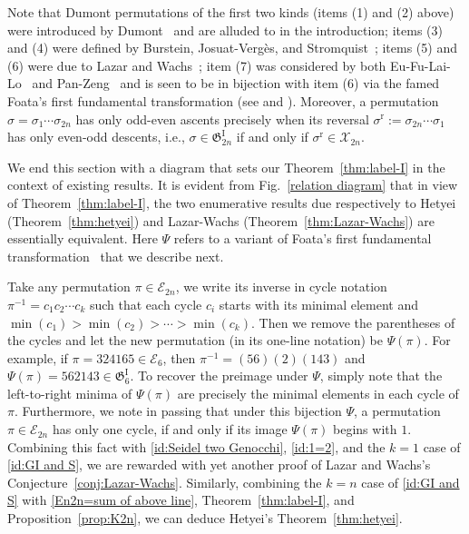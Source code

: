 \documentclass[11pt,reqno]{amsart}
\numberwithin{equation}{section}
\theoremstyle{plain}
\theoremstyle{definition}
\newcommand{\cE}{\mathcal{E}}
\newcommand{\fG}{\mathfrak{G}}
\newcommand{\cX}{\mathcal{X}}
\newcommand{\GI}{\fG^{\mathrm{I}}}
\begin{document}
Note that Dumont permutations of the first two kinds (items (1) and (2) above) were introduced by Dumont~\cite{dum74} and are alluded to in the introduction; items (3) and (4) were defined by Burstein, Josuat-Verg\`es, and Stromquist~\cite{BJS10}; items (5) and (6) were due to Lazar and Wachs~\cite{LW22}; item (7) was considered by both Eu-Fu-Lai-Lo~\cite{EFLL22} and Pan-Zeng~\cite{PZ23} and is seen to be in bijection with item (6) via the famed Foata's first fundamental transformation (see \cite{FS70,PZ23} and \cite[Prop.~2.11]{EFLL22}). Moreover, a permutation $\sigma=\sigma_1\cdots\sigma_{2n}$ has only odd-even ascents precisely when its reversal $\sigma^{\mathrm{r}}:=\sigma_{2n}\cdots\sigma_1$ has only even-odd descents, i.e., $\sigma\in \GI_{2n}$ if and only if $\sigma^{\mathrm{r}}\in\cX_{2n}$.

We end this section with a diagram that sets our Theorem~\ref{thm:label-I} in the context of existing results. It is evident from Fig.~\ref{relation diagram} that in view of Theorem~\ref{thm:label-I}, the two enumerative results due respectively to Hetyei (Theorem~\ref{thm:hetyei}) and Lazar-Wachs (Theorem~\ref{thm:Lazar-Wachs}) are essentially equivalent. Here $\Psi$ refers to a variant of Foata's first fundamental transformation~\cite[Chap.~10.2]{lot97} that we describe next. 

Take any permutation $\pi\in\cE_{2n}$, we write its inverse in cycle notation $\pi^{-1}=c_1c_2\cdots c_k$ such that each cycle $c_i$ starts with its minimal element and $\min(c_1)>\min(c_2)>\cdots>\min(c_k)$. Then we remove the parentheses of the cycles and let the new permutation (in its one-line notation) be $\Psi(\pi)$. For example, if $\pi=324165\in\cE_{6}$, then $\pi^{-1}=(56)(2)(143)$ and $\Psi(\pi)=562143\in\GI_6$. To recover the preimage under $\Psi$, simply note that the left-to-right minima of $\Psi(\pi)$ are precisely the minimal elements in each cycle of $\pi$. Furthermore, we note in passing that under this bijection $\Psi$, a permutation $\pi\in\cE_{2n}$ has only one cycle, if and only if its image $\Psi(\pi)$ begins with $1$. Combining this fact with \eqref{id:Seidel two Genocchi}, \eqref{id:1=2}, and the $k=1$ case of \eqref{id:GI and S}, we are rewarded with yet another proof of Lazar and Wachs's Conjecture~\ref{conj:Lazar-Wachs}. Similarly, combining the $k=n$ case of \eqref{id:GI and S} with \eqref{En2n=sum of above line}, Theorem~\ref{thm:label-I}, and Proposition~\ref{prop:K2n}, we can deduce Hetyei's Theorem~\ref{thm:hetyei}.
\end{document}
